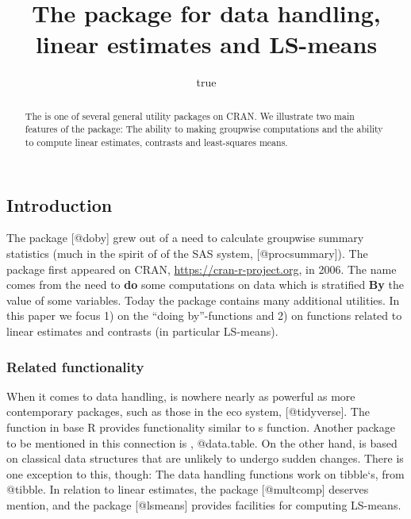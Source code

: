 \documentclass[
]{article}
\title{The \pkg{doBy} package for data handling, linear estimates and
LS-means}
\author{true}
\date{}
\begin{document}
\maketitle
\begin{abstract}
The  is one of several general utility packages on CRAN. We
illustrate two main features of the package: The ability to making
groupwise computations and the ability to compute linear estimates,
contrasts and least-squares means.
\end{abstract}

\hypertarget{introduction}{%
\subsection{Introduction}\label{introduction}}

The  package {[}@doby{]} grew out of a need to calculate
groupwise summary statistics (much in the spirit of 
of the SAS system, {[}@procsummary{]}). The package first appeared on
CRAN, \url{https://cran-r-project.org}, in 2006. The name 
comes from the need to \textbf{do} some computations on data which is
stratified \textbf{By} the value of some variables. Today the package
contains many additional utilities. In this paper we focus 1) on the
``doing by''-functions and 2) on functions related to linear estimates
and contrasts (in particular LS-means).

\hypertarget{related-functionality}{%
\subsubsection{Related functionality}\label{related-functionality}}

When it comes to data handling,  is nowhere nearly as powerful
as more contemporary packages, such as those in the 
eco system, {[}@tidyverse{]}. The  function in base R
provides functionality similar to s  function.
Another package to be mentioned in this connection is
, @data.table. On the other hand,  is
based on classical data structures that are unlikely to undergo sudden
changes. There is one exception to this, though: The data handling
functions work on tibble`s, from  @tibble. In relation
to linear estimates, the  package {[}@multcomp{]}
deserves mention, and the  package {[}@lsmeans{]}
provides facilities for computing LS-means.
\end{document}
